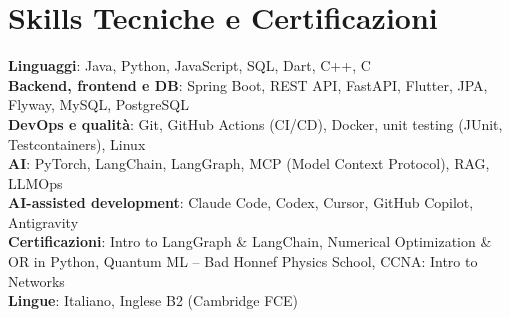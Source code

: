 \section{Skills Tecniche e Certificazioni}
    \begin{itemize}[leftmargin=0.15in, label={}]
    \small{\item{
        \textbf{Linguaggi}{: Java, Python, JavaScript, SQL, Dart, C++, C} \\
        \textbf{Backend, frontend e DB}{: Spring Boot, REST API, FastAPI, Flutter, JPA, Flyway, MySQL, PostgreSQL} \\
        \textbf{DevOps e qualit\`a}{: Git, GitHub Actions (CI/CD), Docker, unit testing (JUnit, Testcontainers), Linux} \\
        \textbf{AI}{: PyTorch, LangChain, LangGraph, MCP (Model Context Protocol), RAG, LLMOps} \\
        \textbf{AI-assisted development}{: Claude Code, Codex, Cursor, GitHub Copilot, Antigravity} \\
        \textbf{Certificazioni}{: Intro to LangGraph \& LangChain, Numerical Optimization \& OR in Python, Quantum ML -- Bad Honnef Physics School, CCNA: Intro to Networks} \\
        \textbf{Lingue}: Italiano, Inglese B2 (Cambridge FCE)
        }}
    \end{itemize}
